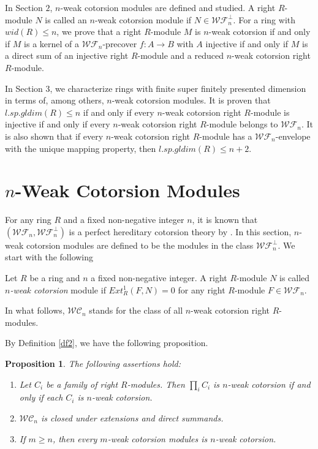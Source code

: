 ﻿\documentclass[
11pt,%
tightenlines,%
twoside,%
onecolumn,%
nofloats,%
nobibnotes,%
nofootinbib,%
superscriptaddress,%
noshowpacs,%
centertags]%
{revtex4}
\newtheorem{proposition}{Proposition}
\begin{document}
In Section $2$, $n$-weak cotorsion  modules are defined and studied.
A right $R$-module $N$ is called an $n$-weak cotorsion module if $N
\in \mathcal{WF}_n^\bot$. For a ring with $wid(R) \leq n$, we prove
that a right $R$-module $M$ is $n$-weak cotorsion if and only if $M$
is a kernel of a $\mathcal{WF}_n$-precover $f: A \rightarrow B$ with
$A$ injective if and only if $M$ is a direct sum of an injective
right $R$-module and a reduced $n$-weak cotorsion right $R$-module.

In Section $3$, we characterize rings with  finite super finitely
presented dimension in terms of, among others, $n$-weak cotorsion
modules. It is proven that $l.sp.gldim(R) \leq n$ if and only if
every $n$-weak cotorsion right $R$-module is injective if and only
if every $n$-weak cotorsion right $R$-module belongs to
$\mathcal{WF}_n$. It is also shown that if every $n$-weak cotorsion
right $R$-module has a $\mathcal{WF}_n$-envelope with the unique
mapping property, then $l.sp.gldim(R) \leq n+2$.

\section{$n$-Weak Cotorsion Modules}

 For any ring $R$ and a fixed non-negative integer $n$,
  it is known that $(\mathcal{WF}_n, \mathcal{WF}_n^\bot)$ is a perfect hereditary
  cotorsion theory by \cite[Proposition $4.18$]{Zo}. In this section, $n$-weak cotorsion
   modules are defined to be the modules in the class $\mathcal{WF}_n^\bot$.
We start with the following

\begin{definition}\label{df2}
Let $R$ be a ring and $n$ a fixed non-negative integer. A right
$R$-module $N$  is called \textit{$n$-weak cotorsion} module if
$Ext^1_R(F,N) = 0$ for any right $R$-module $F \in \mathcal{WF}_n$.
\end{definition}
\par In what follows, $\mathcal{WC}_n$ stands for the class of all $n$-weak
 cotorsion right $R$-modules.

 By Definition \ref{df2}, we have the following proposition.

\begin{proposition}
The following assertions hold:
\begin{enumerate}
\item Let ${C_i}$ be a family of right $R$-modules.  Then $\prod\limits_i C_i$ is $n$-weak
cotorsion if and only if each $C_i$ is $n$-weak cotorsion.
\item $\mathcal{WC}_n$ is closed under extensions and direct summands.
\item  If $m \geq n$, then every $m$-weak cotorsion modules is $n$-weak cotorsion.
\end{enumerate}
\end{proposition}
\end{document}

